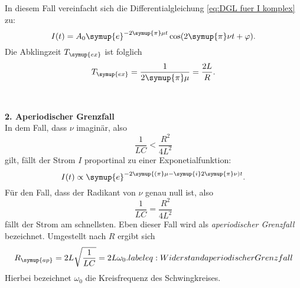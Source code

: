 In diesem Fall vereinfacht sich die Differentialgleichung \eqref{eq:DGL fuer I komplex} zu:
\begin{equation*}
    I(t)=A_{0} \symup{e}^{-2\symup{\pi}\mu t} \cos(2\symup{\pi}\nu t + \varphi).
\end{equation*}
Die Abklingzeit $T_{\symup{ex}}$ ist folglich
\begin{equation}
    T_{\symup{ex}}=\frac{1}{2\symup{\pi}\mu}=\frac{2L}{R}.
    \label{eq:Abklingzeit}
\end{equation}
\\
\\
\textbf{2. Aperiodischer Grenzfall} \\
In dem Fall, dass $\nu$ imaginär, also
\begin{equation*}
    \frac{1}{LC} < \frac{R^{2}}{4L^{2}}
\end{equation*}
gilt, fällt der Strom $I$ proportinal zu einer Exponetialfunktion:
\begin{equation*}
    I(t) \propto \symup{e}^{-2\symup{(\pi}\mu-\symup{i}2\symup{\pi}\nu)t}.
\end{equation*}
Für den Fall, dass der Radikant von $\nu$ genau null ist, also
\begin{equation*}
    \frac{1}{LC} = \frac{R^{2}}{4L^{2}}
\end{equation*}
fällt der Strom am schnellsten. Eben dieser Fall wird als \textit{aperiodischer Grenzfall} bezeichnet. Umgestellt nach $R$ ergibt sich
\begin{equation}
    R_{\symup{ap}} = 2L\sqrt{\frac{1}{LC}} = 2L\omega_0.
    label{eq:Widerstand aperiodischer Grenzfall}
\end{equation}
Hierbei bezeichnet $\omega_0$ die Kreisfrequenz des Schwingkreises.

